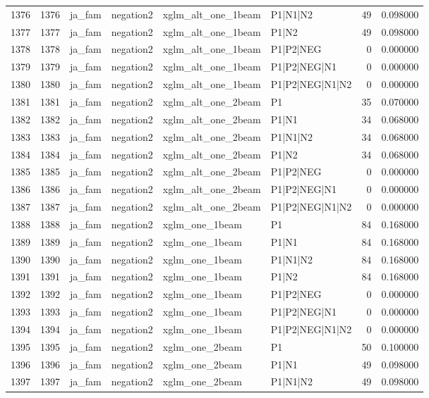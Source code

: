 \begin{tabular}{lrllllrr}
1376 & 1376 & ja_fam & negation2 & xglm_alt_one_1beam & P1|N1|N2 & 49 & 0.098000 \\
1377 & 1377 & ja_fam & negation2 & xglm_alt_one_1beam & P1|N2 & 49 & 0.098000 \\
1378 & 1378 & ja_fam & negation2 & xglm_alt_one_1beam & P1|P2|NEG & 0 & 0.000000 \\
1379 & 1379 & ja_fam & negation2 & xglm_alt_one_1beam & P1|P2|NEG|N1 & 0 & 0.000000 \\
1380 & 1380 & ja_fam & negation2 & xglm_alt_one_1beam & P1|P2|NEG|N1|N2 & 0 & 0.000000 \\
1381 & 1381 & ja_fam & negation2 & xglm_alt_one_2beam & P1 & 35 & 0.070000 \\
1382 & 1382 & ja_fam & negation2 & xglm_alt_one_2beam & P1|N1 & 34 & 0.068000 \\
1383 & 1383 & ja_fam & negation2 & xglm_alt_one_2beam & P1|N1|N2 & 34 & 0.068000 \\
1384 & 1384 & ja_fam & negation2 & xglm_alt_one_2beam & P1|N2 & 34 & 0.068000 \\
1385 & 1385 & ja_fam & negation2 & xglm_alt_one_2beam & P1|P2|NEG & 0 & 0.000000 \\
1386 & 1386 & ja_fam & negation2 & xglm_alt_one_2beam & P1|P2|NEG|N1 & 0 & 0.000000 \\
1387 & 1387 & ja_fam & negation2 & xglm_alt_one_2beam & P1|P2|NEG|N1|N2 & 0 & 0.000000 \\
1388 & 1388 & ja_fam & negation2 & xglm_one_1beam & P1 & 84 & 0.168000 \\
1389 & 1389 & ja_fam & negation2 & xglm_one_1beam & P1|N1 & 84 & 0.168000 \\
1390 & 1390 & ja_fam & negation2 & xglm_one_1beam & P1|N1|N2 & 84 & 0.168000 \\
1391 & 1391 & ja_fam & negation2 & xglm_one_1beam & P1|N2 & 84 & 0.168000 \\
1392 & 1392 & ja_fam & negation2 & xglm_one_1beam & P1|P2|NEG & 0 & 0.000000 \\
1393 & 1393 & ja_fam & negation2 & xglm_one_1beam & P1|P2|NEG|N1 & 0 & 0.000000 \\
1394 & 1394 & ja_fam & negation2 & xglm_one_1beam & P1|P2|NEG|N1|N2 & 0 & 0.000000 \\
1395 & 1395 & ja_fam & negation2 & xglm_one_2beam & P1 & 50 & 0.100000 \\
1396 & 1396 & ja_fam & negation2 & xglm_one_2beam & P1|N1 & 49 & 0.098000 \\
1397 & 1397 & ja_fam & negation2 & xglm_one_2beam & P1|N1|N2 & 49 & 0.098000 \\

\end{tabular}
